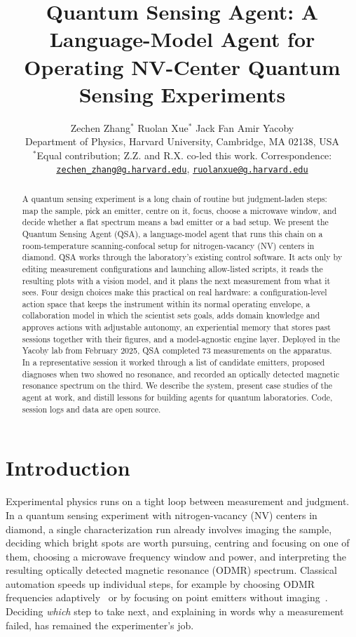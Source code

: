\documentclass[10pt]{article}
\title{Quantum Sensing Agent: A Language-Model Agent for\\Operating NV-Center Quantum Sensing Experiments}
\author{
  Zechen Zhang$^{*}$ \quad Ruolan Xue$^{*}$ \quad Jack Fan \quad Amir Yacoby\\[4pt]
  Department of Physics, Harvard University, Cambridge, MA 02138, USA\\[2pt]
  {\small $^{*}$Equal contribution; Z.Z. and R.X. co-led this work. Correspondence: \href{mailto:zechen_zhang@g.harvard.edu}{\nolinkurl{zechen_zhang@g.harvard.edu}}, \href{mailto:ruolanxue@g.harvard.edu}{\nolinkurl{ruolanxue@g.harvard.edu}}}
}
\date{}
\newcommand{\qsa}{QSA}
\begin{document}
\maketitle

\begin{abstract}
A quantum sensing experiment is a long chain of routine but judgment-laden steps: map the sample, pick an emitter, centre on it, focus, choose a microwave window, and decide whether a flat spectrum means a bad emitter or a bad setup.
We present the Quantum Sensing Agent (\qsa{}), a language-model agent that runs this chain on a room-temperature scanning-confocal setup for nitrogen-vacancy (NV) centers in diamond.
\qsa{} works through the laboratory's existing control software. It acts only by editing measurement configurations and launching allow-listed scripts, it reads the resulting plots with a vision model, and it plans the next measurement from what it sees.
Four design choices make this practical on real hardware: a configuration-level action space that keeps the instrument within its normal operating envelope, a collaboration model in which the scientist sets goals, adds domain knowledge and approves actions with adjustable autonomy, an experiential memory that stores past sessions together with their figures, and a model-agnostic engine layer.
Deployed in the Yacoby lab from February 2025, \qsa{} completed 73 measurements on the apparatus. In a representative session it worked through a list of candidate emitters, proposed diagnoses when two showed no resonance, and recorded an optically detected magnetic resonance spectrum on the third.
We describe the system, present case studies of the agent at work, and distill lessons for building agents for quantum laboratories. Code, session logs and data are open source.
\end{abstract}

\section{Introduction}
\label{sec:intro}

Experimental physics runs on a tight loop between measurement and judgment.
In a quantum sensing experiment with nitrogen-vacancy (NV) centers in diamond, a single characterization run already involves imaging the sample, deciding which bright spots are worth pursuing, centring and focusing on one of them, choosing a microwave frequency window and power, and interpreting the resulting optically detected magnetic resonance (ODMR) spectrum.
Classical automation speeds up individual steps, for example by choosing ODMR frequencies adaptively~\cite{dushenko2020odmr} or by focusing on point emitters without imaging~\cite{sahoo2023find}.
Deciding \emph{which} step to take next, and explaining in words why a measurement failed, has remained the experimenter's job.
\end{document}

